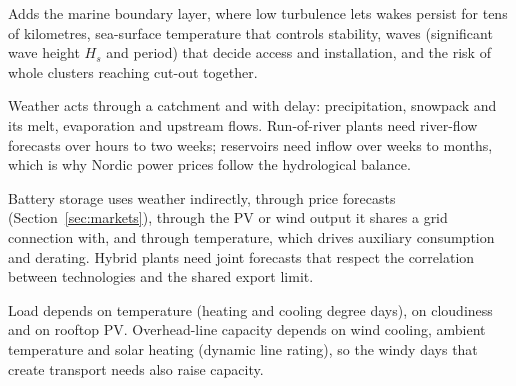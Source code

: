  Adds the marine boundary layer, where low turbulence lets wakes persist for tens of kilometres, sea-surface temperature that controls stability, waves (significant wave height $H_s$ and period) that decide access and installation, and the risk of whole clusters reaching cut-out together.

 Weather acts through a catchment and with delay: precipitation, snowpack and its melt, evaporation and upstream flows. Run-of-river plants need river-flow forecasts over hours to two weeks; reservoirs need inflow over weeks to months, which is why Nordic power prices follow the hydrological balance.

 Battery storage uses weather indirectly, through price forecasts (Section~\ref{sec:markets}), through the PV or wind output it shares a grid connection with, and through temperature, which drives auxiliary consumption and derating. Hybrid plants need joint forecasts that respect the correlation between technologies and the shared export limit.

 Load depends on temperature (heating and cooling degree days), on cloudiness and on rooftop PV. Overhead-line capacity depends on wind cooling, ambient temperature and solar heating (dynamic line rating), so the windy days that create transport needs also raise capacity.
